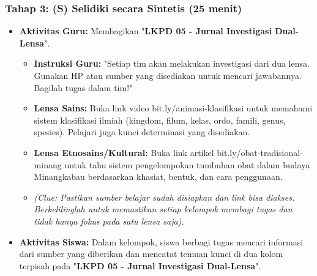\documentclass[a4paper,12pt]{article}
\begin{document}
\subsubsection{Tahap 3: (S) Selidiki secara Sintetis (25 menit)}
\begin{itemize}
\item \textbf{Aktivitas Guru:} Membagikan "\textbf{LKPD 05 - Jurnal Investigasi Dual-Lensa}".
    \begin{itemize}
    \item \textbf{Instruksi Guru:} "Setiap tim akan melakukan investigasi dari dua lensa. Gunakan HP atau sumber yang disediakan untuk mencari jawabannya. Bagilah tugas dalam tim!"
    \item \textbf{Lensa Sains:} Buka link video bit.ly/animasi-klasifikasi untuk memahami sistem klasifikasi ilmiah (kingdom, filum, kelas, ordo, famili, genus, spesies). Pelajari juga kunci determinasi yang disediakan.
    \item \textbf{Lensa Etnosains/Kultural:} Buka link artikel bit.ly/obat-tradisional-minang untuk tahu sistem pengelompokan tumbuhan obat dalam budaya Minangkabau berdasarkan khasiat, bentuk, dan cara penggunaan.
    \item \textit{(Clue: Pastikan sumber belajar sudah disiapkan dan link bisa diakses. Berkelilinglah untuk memastikan setiap kelompok membagi tugas dan tidak hanya fokus pada satu lensa saja).}
    \end{itemize}
\item \textbf{Aktivitas Siswa:} Dalam kelompok, siswa berbagi tugas mencari informasi dari sumber yang diberikan dan mencatat temuan kunci di dua kolom terpisah pada "\textbf{LKPD 05 - Jurnal Investigasi Dual-Lensa}".
\end{itemize}
\end{document}
